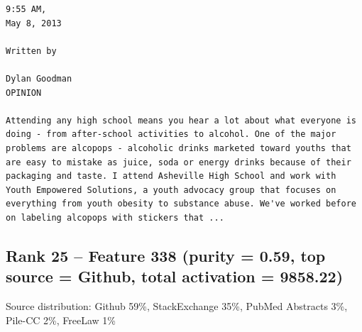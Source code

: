 \begin{verbatim}
9:55 AM,
May 8, 2013

Written by

Dylan Goodman
OPINION

Attending any high school means you hear a lot about what everyone is doing - from after-school activities to alcohol. One of the major problems are alcopops - alcoholic drinks marketed toward youths that are easy to mistake as juice, soda or energy drinks because of their packaging and taste. I attend Asheville High School and work with Youth Empowered Solutions, a youth advocacy group that focuses on everything from youth obesity to substance abuse. We've worked before on labeling alcopops with stickers that ...

\end{verbatim}

\subsection*{Rank 25 -- Feature 338 (purity = 0.59, top source = Github, total activation = 9858.22)}

Source distribution: Github 59\%, StackExchange 35\%, PubMed Abstracts 3\%, Pile-CC 2\%, FreeLaw 1\%

